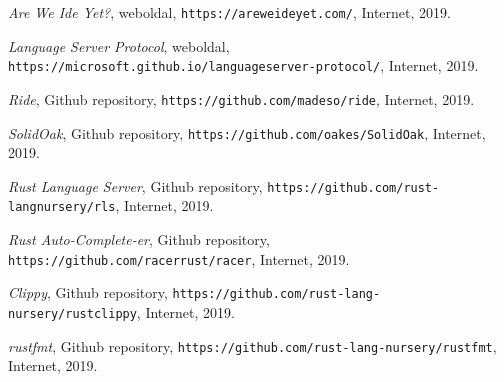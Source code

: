 \begin{thebibliography}{x}

\textit{Are We Ide Yet?}, weboldal, \texttt{https://areweideyet.com/}, Internet, 2019.

\textit{Language Server Protocol}, weboldal, \texttt{https://microsoft.github.io/language\-server-protocol/}, Internet, 2019.

\textit{Ride}, Github repository, \texttt{https://github.com/madeso/ride}, Internet, 2019.

\textit{SolidOak}, Github repository, \texttt{https://github.com/oakes/SolidOak}, Internet, 2019.

\textit{Rust Language Server}, Github repository, \texttt{https://github.com/rust-lang\-nursery/rls}, Internet, 2019.

\textit{Rust Auto-Complete-er}, Github repository, \texttt{https://github.com/racer\-rust/racer}, Internet, 2019.

\textit{Clippy}, Github repository, \texttt{https://github.com/rust-lang-nursery/rust\-clippy}, Internet, 2019.

\textit{rustfmt}, Github repository, \texttt{https://github.com/rust-lang-nursery/rustfmt}, Internet, 2019.


\end{thebibliography}
